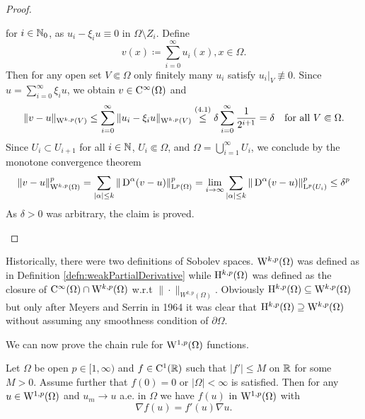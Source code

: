 \begin{proof}
\begin{enumerate}[i)]
\begin{equation}
    \end{equation}
    for $i \in \mathbb{N}_0$, as $u_i - \xi_i u \equiv 0$ in $\Omega \setminus Z_i$.
    Define
    $$
    v(x) \coloneqq \sum_{i = 0}^\infty u_i(x), x \in \Omega.
    $$
    Then for any open set $V \Subset \Omega$ only finitely many $u_i$ satisfy $u_i|_V \not\equiv 0$.
    Since $u = \sum_{i = 0}^\infty \xi_i u$, we obtain $v \in \mathrm{C}^\infty(\Omega)$ and
    $$
    \|v - u\|_{\mathrm{W}^{k,p}(V)}
    \leq \sum_{i = 0}^\infty \|u_i - \xi_i u\|_{\mathrm{W}^{k,p}(V)}
    \overset{(4.1)}{\leq} \delta \sum_{i = 0}^\infty \frac{1}{2^{i + 1}} 
    = \delta \quad\text{for all } V \Subset \Omega.
    $$
    Since $U_i \subset U_{i + 1}$ for all $i \in \mathbb{N}$, $U_i \Subset \Omega$, and $\Omega = \bigcup_{i = 1}^\infty U_i$, we conclude by the monotone convergence theorem
    $$
    \|v - u\|_{\mathrm{W}^{k,p}(\Omega)}^p
    = \sum_{|\alpha| \leq k} \|\,{\operatorname{D}}^\alpha (v - u) \|_{\mathrm{L}^p(\Omega)}^p
    = \lim_{i \to \infty} \sum_{|\alpha| \leq k} \|\,{\operatorname{D}}^\alpha(v - u) \|_{\mathrm{L}^p(U_i)}^p
    \leq \delta^p
    $$
    As $\delta > 0$ was arbitrary, the claim is proved. \qedhere
\end{enumerate}
\end{proof}

\begin{rem}
  Historically, there were two definitions of Sobolev spaces.
  $\mathrm{W}^{k,p}(\Omega)$ was defined as in Definition \ref{defn:weakPartialDerivative} while $\mathrm{H}^{k,p}(\Omega)$ was defined as the closure of $\mathrm{C}^\infty(\Omega) \cap \mathrm{W}^{k,p}(\Omega)$ w.r.t $\|\cdot\|_{W^{k,p}(\Omega)}$.
  Obviously $\mathrm{H}^{k,p}(\Omega) \subseteq \mathrm{W}^{k,p}(\Omega)$ but only after Meyers and Serrin in 1964 \cite{meyers1964} it was clear that $\mathrm{H}^{k,p}(\Omega) \supseteq \mathrm{W}^{k,p}(\Omega)$ without assuming any smoothness condition of $\partial \Omega$.
\end{rem}

We can now prove the chain rule for $\mathrm{W}^{1,p}(\Omega)$ functions.

\begin{prop}
  Let $\Omega$ be open $p \in [1,\infty)$ and $f \in \mathrm{C}^1(\mathbb{R})$ such that $|f'| \leq M$ on $\mathbb{R}$ for some $M > 0$.
  Assume further that $f(0) = 0$ or $|\Omega| < \infty$ is satisfied.
  Then for any $u \in \mathrm{W}^{1,p}(\Omega)$ and $u_m \to u$ a.e. in $\Omega$ we have $f(u)$ in $\mathrm{W}^{1,p}(\Omega)$ with $$\nabla f(u) = f'(u) \nabla u.$$
\end{prop}

